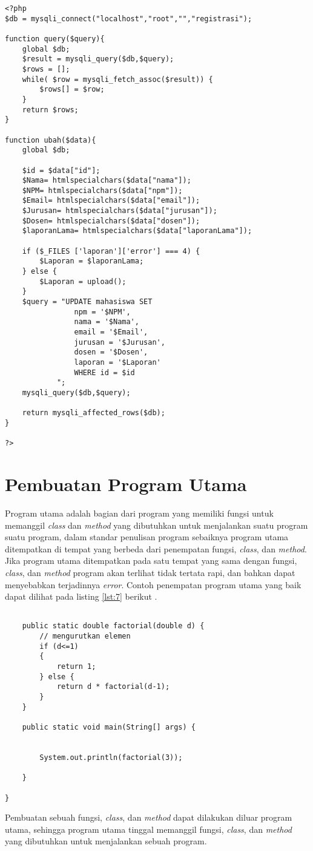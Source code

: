 \begin{lstlisting}[caption=Contoh commit standar,label={lst:6}]
<?php 
$db = mysqli_connect("localhost","root","","registrasi");

function query($query){
	global $db;
	$result = mysqli_query($db,$query);
	$rows = [];
	while( $row = mysqli_fetch_assoc($result)) {
		$rows[] = $row; 
	}
	return $rows;
}

function ubah($data){
	global $db;

	$id = $data["id"];
	$Nama= htmlspecialchars($data["nama"]);
	$NPM= htmlspecialchars($data["npm"]);
	$Email= htmlspecialchars($data["email"]);
	$Jurusan= htmlspecialchars($data["jurusan"]); 
	$Dosen= htmlspecialchars($data["dosen"]);
	$laporanLama= htmlspecialchars($data["laporanLama"]);

	if ($_FILES ['laporan']['error'] === 4) {
		$Laporan = $laporanLama;
	} else {
		$Laporan = upload();
	}
	$query = "UPDATE mahasiswa SET 
				npm = '$NPM',
				nama = '$Nama',
				email = '$Email',
				jurusan = '$Jurusan',
				dosen = '$Dosen',
				laporan = '$Laporan' 
				WHERE id = $id
			";
	mysqli_query($db,$query);

	return mysqli_affected_rows($db);
}

?>
\end{lstlisting}

\section{Pembuatan Program Utama}
\par 
Program utama adalah bagian dari program yang memiliki fungsi untuk memanggil \textit{class} dan \textit{method} yang dibutuhkan untuk menjalankan suatu program suatu program, dalam standar penulisan program sebaiknya program utama ditempatkan di tempat yang berbeda dari penempatan  fungsi, \textit{class}, dan \textit{method}. Jika program utama ditempatkan pada satu tempat yang sama dengan fungsi, \textit{class}, dan \textit{method} program akan terlihat tidak tertata rapi, dan bahkan dapat menyebabkan terjadinnya \textit{error}. Contoh penempatan program utama yang baik dapat dilihat pada listing \ref{lst:7} berikut .

\begin{lstlisting}[caption=Contoh commit standar,label={lst:7}]
	
	public static double factorial(double d) {
		// mengurutkan elemen
		if (d<=1)
		{
			return 1;
		} else {
			return d * factorial(d-1);
		}
	}

	public static void main(String[] args) {
	
		
		System.out.println(factorial(3));
		
	}

}
\end{lstlisting}
\par 
Pembuatan sebuah fungsi, \textit{class}, dan \textit{method} dapat dilakukan diluar program utama, sehingga program utama tinggal memanggil fungsi, \textit{class}, dan \textit{method} yang dibutuhkan untuk menjalankan sebuah program.



